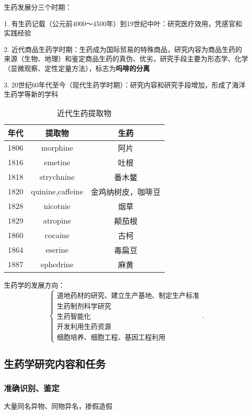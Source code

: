 \begin{notation}
    生药发展分三个时期：

    1. 有生药记载（公元前4000～4500年）到19世纪中叶：研究医疗效用，凭感官和实践经验

    2. 近代商品生药学时期：生药成为国际贸易的特殊商品，研究内容为商品生药的来源（生物、地理）和鉴定商品生药的真伪、优劣，研究手段主要为形态学、化学（显微观察、定性定量方法），标志为\textbf{吗啡的分离}

    3. 20世纪60年代至今（现代生药学时期）：研究内容和研究手段增加，形成了海洋生药学等新的学科
\end{notation}
\begin{table}[htpb]
    \centering
    \caption{近代生药提取物}
    \label{tab:近代生药提取物}
    \begin{tabular}{ccc}
    \toprule
    年代 & 提取物 & 生药 \\
    \midrule
    1806 & morphine & 阿片 \\
    1816 & emetine & 吐根\\
    1818 & strychnine & 番木鳖\\
    1820 & quinine,caffeine & 金鸡纳树皮，咖啡豆\\
    1828 & nicotnie & 烟草\\
    1829 & atropine & 颠茄根\\
    1860 & cocaine & 古柯\\
    1864 & eserine & 毒扁豆\\
    1887 & ephedrine & 麻黄\\
    \bottomrule
    \end{tabular}
\end{table}
生药学的发展方向：
\[
    \begin{cases}
        \text{道地药材的研究、建立生产基地、制定生产标准}\\ 
        \text{生药制剂科学研究}\\ 
        \text{生药智能化}\\ 
        \text{开发利用生药资源}\\ 
        \text{细胞培养、细胞工程、基因工程利用}
    \end{cases}
.\] 
\subsection{生药学研究内容和任务}%
\label{sub:生药学研究内容和任务}
\subsubsection*{准确识别、鉴定}%
\label{subsub:准确识别-鉴定}
大量同名异物、同物异名，掺假造假
